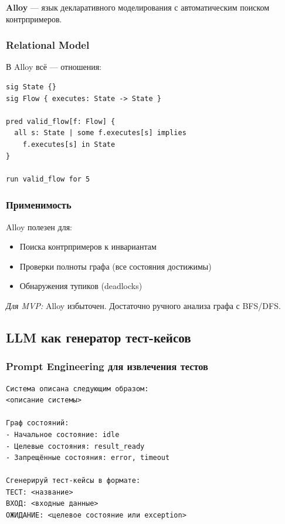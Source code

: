 \documentclass[10pt, oneside]{article}
\begin{document}
\textbf{Alloy} --- язык декларативного моделирования с автоматическим
поиском контрпримеров.

\subsubsection{Relational Model}

В Alloy всё --- отношения:

\begin{lstlisting}[language={},caption={Пример Alloy-спецификации}]
sig State {}
sig Flow { executes: State -> State }

pred valid_flow[f: Flow] {
  all s: State | some f.executes[s] implies
    f.executes[s] in State
}

run valid_flow for 5
\end{lstlisting}

\subsubsection{Применимость}

Alloy полезен для:
\begin{itemize}[leftmargin=1.5em]
  \item Поиска контрпримеров к инвариантам
  \item Проверки полноты графа (все состояния достижимы)
  \item Обнаружения тупиков (deadlocks)
\end{itemize}

\textit{Для MVP:} Alloy избыточен. Достаточно ручного анализа графа
с BFS/DFS.

\subsection{LLM как генератор тест-кейсов}

\subsubsection{Prompt Engineering для извлечения тестов}

\begin{lstlisting}[language={},caption={Промпт для генерации тестов из описания}]
Система описана следующим образом:
<описание системы>

Граф состояний:
- Начальное состояние: idle
- Целевые состояния: result_ready
- Запрещённые состояния: error, timeout

Сгенерируй тест-кейсы в формате:
ТЕСТ: <название>
ВХОД: <входные данные>
ОЖИДАНИЕ: <целевое состояние или exception>
\end{lstlisting}
\end{document}
